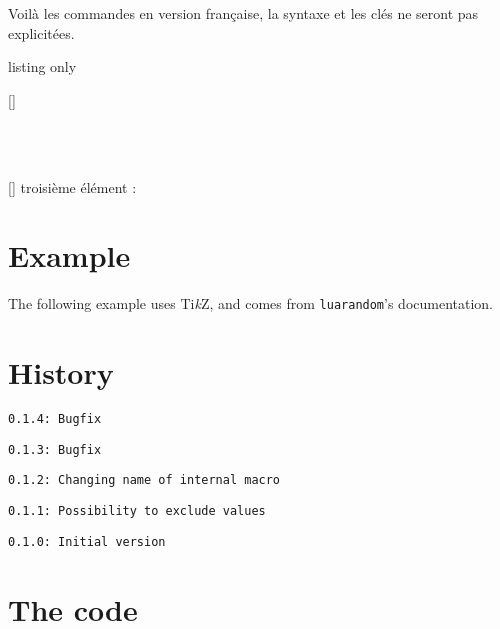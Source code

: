 \documentclass[11pt,a4paper]{ltxdoc}
\providecommand\tikzlogo{Ti\textit{k}Z}
\let\TikZ\tikzlogo
\begin{document}
Voilà les commandes en version française, la syntaxe et les clés ne seront pas explicitées.

\begin{DemoCode}{listing only}
\ListeRandint[Min=..,Max=..,Nb=..,Repet=..,Graine=..,Tri=..,Sep=..,Exclure=..]{\macro}

[\macrores]
\end{DemoCode}

\begin{DemoCode}{}
\ListeRandint[Min=5,Max=15,Nb=7,Repet,Tri=croiss,Sep={/}]{\maliste}\maliste\\
\end{DemoCode}

\begin{DemoCode}{}
\ListeRandint[Min=50,Max=100,Nb=10,Repet,Tri=croiss]{\malisteB}\malisteB\\
[\montroisieme]%
troisième élément : \montroisieme
\end{DemoCode}

\pagebreak

\section{Example}

The following example uses \TikZ, and comes from \texttt{luarandom}'s documentation.

\begin{DemoCode}{}
\end{DemoCode}

\pagebreak

\section{History}

\texttt{0.1.4: Bugfix}

\texttt{0.1.3: Bugfix}

\texttt{0.1.2: Changing name of internal macro}

\texttt{0.1.1: Possibility to exclude values}

\texttt{0.1.0: Initial version}

\section{The code}

\end{document}
